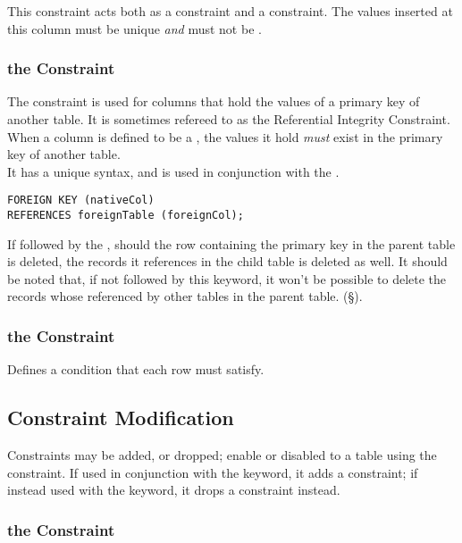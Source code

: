 \documentclass[11pt,a4paper,twocolumn]{book}
\begin{document}
This constraint acts both as a  constraint and a  constraint. The values inserted at this column must be unique \textit{and} must not be .


\subsubsection{the  Constraint}

The  constraint is used for columns that hold the values of a primary key of another table. It is sometimes refereed to as the Referential Integrity Constraint.\\

When a column is defined to be a , the values it hold \textit{must} exist in the primary key of another table.\\

It has a unique syntax, and is used in conjunction with the .

\begin{lstlisting}
FOREIGN KEY (nativeCol)
REFERENCES foreignTable (foreignCol);
\end{lstlisting}

If followed by the , should the row containing the primary key in the parent table is deleted, the records it references in the child table is deleted as well. It should be noted that, if not followed by this keyword, it won't be possible to delete the records whose referenced by other tables in the parent table. (\S{}).

\subsubsection{the  Constraint}

Defines a condition that each row must satisfy.

\subsection{Constraint Modification}

Constraints may be added, or dropped; enable or disabled to a table using the  constraint. If used in conjunction with the  keyword, it adds a constraint; if instead used with the  keyword, it drops a constraint instead.\\

\subsubsection{the  Constraint}
\end{document}
